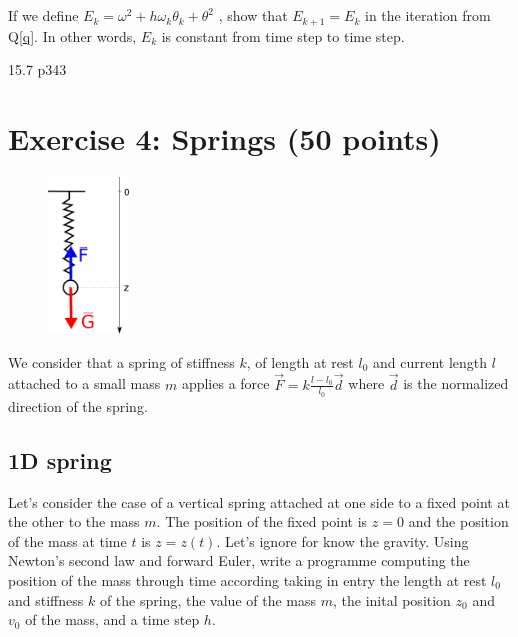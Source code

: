 \subsection{} If we define $E_k = \omega^2 + h\omega_k\theta_k + \theta^2$ , show that $E_{k+1} = E_k$ in the iteration from Q\ref{q}. In other words, $E_k$ is constant from time step to time step.
  
15.7 p343
 
\section*{Exercise 4: Springs \normalsize \textnormal(50 points)}


\begin{figure}
  \centering
  \vspace{-0.5cm}
\includegraphics[width=0.19\textwidth]{spring.png}
\vspace{-1cm}
\end{figure}

We consider that a spring of stiffness $k$, of length at rest $l_0$ and current length $l$ attached to a small mass $m$ applies a force $\vec{F} = k\frac{l - l_0}{l_0} \vec{d}$ where $\vec{d}$ is the normalized direction of the spring.

\subsection{1D spring} Let's consider the case of a vertical spring attached at one side to a fixed point at the other to the mass $m$. The position of the fixed point is $z = 0$ and the position of the mass at time $t$ is $z = z(t)$. Let's ignore for know the gravity. Using Newton's second law and forward Euler, write a programme computing the position of the mass through time according taking in entry the length at rest $l_0$ and stiffness $k$ of the spring, the value of the mass $m$, the inital position $z_0$ and $v_0$ of the mass, and a time step $h$.

